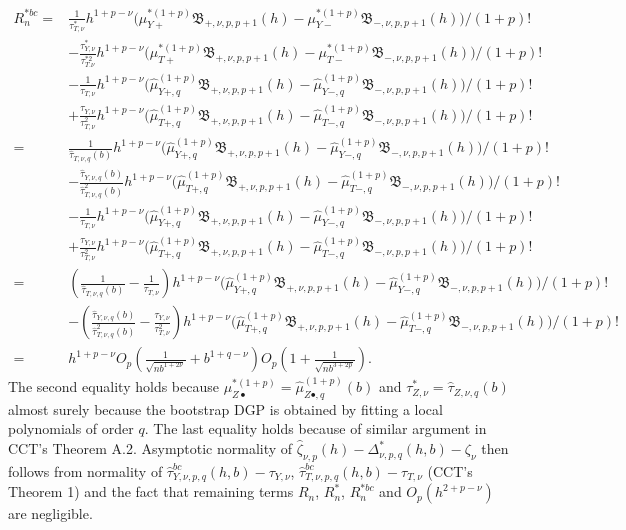 \documentclass[12pt,]{article}
\DeclareMathOperator{\1}{\mathbbm{1}}
\newcommand{\Bf}{\mathfrak{B}}
\begin{document}
\begin{align*}
R_n^{*bc}
	= & \frac{1}{\tau_{T, \nu}^*} h^{1 + p - \nu} 
	    \big(\mu_{Y+}^{*(1 + p)} \Bf_{+, \nu, p, p+1}(h) - \mu_{Y-}^{*(1 + p)} \Bf_{-, \nu, p, p+1}(h) \big)/(1 + p)! \\
	& - \frac{\tau_{Y, \nu}^*}{\tau_{T. \nu}^{*2}} h^{1 + p - \nu} 
	    \big(\mu_{T+}^{*(1 + p)} \Bf_{+, \nu, p, p+1}(h) - \mu_{T-}^{*(1 + p)} \Bf_{-, \nu, p, p+1}(h) \big)/(1 + p)! \\
	& - \frac{1}{\tau_{T,\nu}} h^{1 + p - \nu} 
	    \big(\hat \mu_{Y+, q}^{(1 + p)} \Bf_{+, \nu, p, p+1}(h) - \hat \mu_{Y-, q}^{(1 + p)} \Bf_{-, \nu, p, p+1}(h) \big)/(1 + p)! \\
	& + \frac{\tau_{Y,\nu}}{\tau_{T,\nu}^2} h^{1 + p - \nu} 
	    \big(\hat \mu_{T+, q}^{(1 + p)} \Bf_{+, \nu, p, p+1}(h) - \hat \mu_{T-, q}^{(1 + p)} \Bf_{-, \nu, p, p+1}(h) \big)/(1 + p)! \\
	= & \frac{1}{\hat\tau_{T, \nu, q}(b)} h^{1 + p - \nu} 
	    \big(\hat \mu_{Y+, q}^{(1 + p)} \Bf_{+, \nu, p, p+1}(h) - \hat \mu_{Y-, q}^{(1 + p)} \Bf_{-, \nu, p, p+1}(h) \big)/(1 + p)! \\
	& - \frac{\hat\tau_{Y, \nu, q}(b)}{\hat\tau_{T, \nu, q}^{2}(b)} h^{1 + p - \nu} 
	    \big(\hat \mu_{T+, q}^{(1 + p)} \Bf_{+, \nu, p, p+1}(h) - \hat \mu_{T-, q}^{(1 + p)} \Bf_{-, \nu, p, p+1}(h) \big)/(1 + p)! \\
	& - \frac{1}{\tau_{T,\nu}} h^{1 + p - \nu} 
		\big(\hat \mu_{Y+, q}^{(1 + p)} \Bf_{+, \nu, p, p+1}(h) - \hat \mu_{Y-, q}^{(1 + p)} \Bf_{-, \nu, p, p+1}(h) \big)/(1 + p)! \\
	& + \frac{\tau_{Y,\nu}}{\tau_{T,\nu}^2} h^{1 + p - \nu} 
		\big(\hat \mu_{T+, q}^{(1 + p)} \Bf_{+, \nu, p, p+1}(h) - \hat \mu_{T-, q}^{(1 + p)} \Bf_{-, \nu, p, p+1}(h) \big)/(1 + p)! \\
	= & (\frac{1}{\hat\tau_{T, \nu, q}(b)} - \frac{1}{\tau_{T,\nu}}) h^{1 + p - \nu} 
	    \big(\hat \mu_{Y+, q}^{(1 + p)} \Bf_{+, \nu, p, p+1}(h) - \hat \mu_{Y-, q}^{(1 + p)} \Bf_{-, \nu, p, p+1}(h) \big)/(1 + p)! \\
	& - (\frac{\hat\tau_{Y, \nu, q}(b)}{\hat\tau_{T, \nu, q}^{2}(b)} - \frac{\tau_{Y,\nu}}{\tau_{T,\nu}^2}) h^{1 + p - \nu} 
	    \big(\hat \mu_{T+, q}^{(1 + p)} \Bf_{+, \nu, p, p+1}(h) - \hat \mu_{T-, q}^{(1 + p)} \Bf_{-, \nu, p, p+1}(h) \big)/(1 + p)! \\
	= & h^{1 + p - \nu} O_p(\frac{1}{\sqrt{nb^{1 + 2 \nu}}} + b^{1 + q - \nu}) O_p(1 + \frac{1}{\sqrt{nb^{3 + 2p}}}).
\end{align*}
The second equality holds because $\mu_{Z \bullet}^{*(1+p)} = \hat\mu_{Z \bullet, q}^{(1+p)}(b)$ and $\tau_{Z, \nu}^* = \hat \tau_{Z, \nu, q} (b)$ almost surely because the bootstrap DGP is obtained by fitting a local polynomials of order $q$. The last equality holds because of similar argument in CCT's Theorem A.2. Asymptotic normality of $\hat\zeta_{\nu, p}(h) - \Delta_{\nu, p, q}^*(h,b) - \zeta_{\nu}$ then follows from normality of $\hat\tau_{Y, \nu, p, q}^{bc} (h, b) - \tau_{Y, \nu}$, $\hat\tau_{T, \nu, p, q}^{bc} (h, b) - \tau_{T, \nu}$ (CCT's Theorem 1) and the fact that remaining terms $R_n$, $R_n^*$, $R_n^{*bc}$ and $O_p(h^{2 + p - \nu})$ are negligible. 
\end{document}
